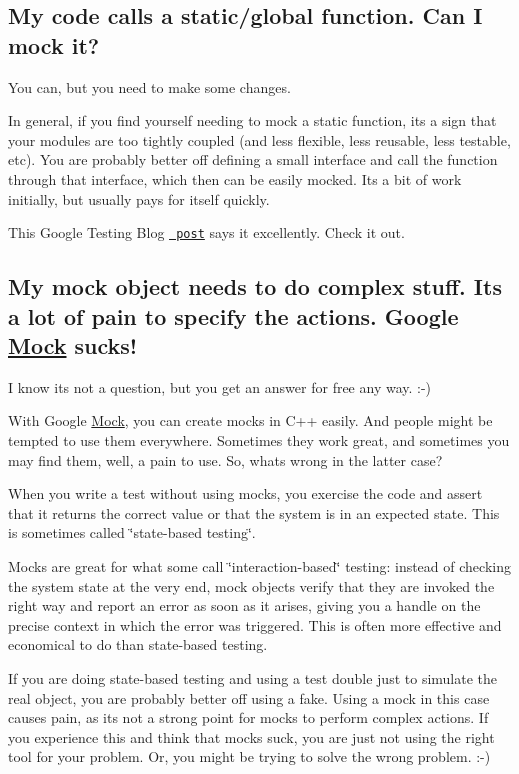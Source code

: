 \subsection*{My code calls a static/global function. Can I mock it?}

You can, but you need to make some changes.

In general, if you find yourself needing to mock a static function, it\textquotesingle{}s a sign that your modules are too tightly coupled (and less flexible, less reusable, less testable, etc). You are probably better off defining a small interface and call the function through that interface, which then can be easily mocked. It\textquotesingle{}s a bit of work initially, but usually pays for itself quickly.

This Google Testing Blog \href{http://googletesting.blogspot.com/2008/06/defeat-static-cling.html}\texttt{ post} says it excellently. Check it out.

\subsection*{My mock object needs to do complex stuff. It\textquotesingle{}s a lot of pain to specify the actions. Google \mbox{\hyperlink{class_mock}{Mock}} sucks!}

I know it\textquotesingle{}s not a question, but you get an answer for free any way. \+:-\/)

With Google \mbox{\hyperlink{class_mock}{Mock}}, you can create mocks in C++ easily. And people might be tempted to use them everywhere. Sometimes they work great, and sometimes you may find them, well, a pain to use. So, what\textquotesingle{}s wrong in the latter case?

When you write a test without using mocks, you exercise the code and assert that it returns the correct value or that the system is in an expected state. This is sometimes called \char`\"{}state-\/based testing\char`\"{}.

Mocks are great for what some call \char`\"{}interaction-\/based\char`\"{} testing\+: instead of checking the system state at the very end, mock objects verify that they are invoked the right way and report an error as soon as it arises, giving you a handle on the precise context in which the error was triggered. This is often more effective and economical to do than state-\/based testing.

If you are doing state-\/based testing and using a test double just to simulate the real object, you are probably better off using a fake. Using a mock in this case causes pain, as it\textquotesingle{}s not a strong point for mocks to perform complex actions. If you experience this and think that mocks suck, you are just not using the right tool for your problem. Or, you might be trying to solve the wrong problem. \+:-\/)

